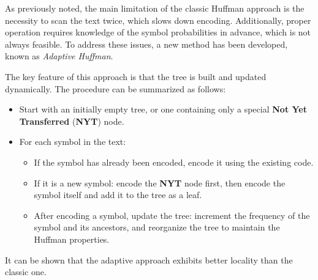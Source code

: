 \documentclass{subfiles}
\begin{document}
    As previously noted, 
        the main limitation of the classic Huffman approach 
        is the necessity to scan the text twice, which slows down encoding.
    Additionally, proper operation requires knowledge of the symbol probabilities in advance,
        which is not always feasible.
    To address these issues, a new method has been developed, 
        known as \emph{Adaptive Huffman}.

    The key feature of this approach is that the tree is built and updated dynamically.
    The procedure can be summarized as follows:
    \begin{itemize}
        \item Start with an initially empty tree,
            or one containing only a special \textbf{Not Yet Transferred} (\textbf{NYT}) node.

        \item For each symbol in the text: 
            \begin{itemize}
                \item If the symbol has already been encoded, encode it using the existing code.

                \item If it is a new symbol:
                    encode the \textbf{NYT} node first, 
                    then encode the symbol itself and add it to the tree as a leaf.

                \item After encoding a symbol, update the tree:
                    increment the frequency of the symbol and its ancestors,
                    and reorganize the tree to maintain the Huffman properties.
            \end{itemize}
    \end{itemize}

    It can be shown that the adaptive approach exhibits better locality than the classic one.
\end{document}
